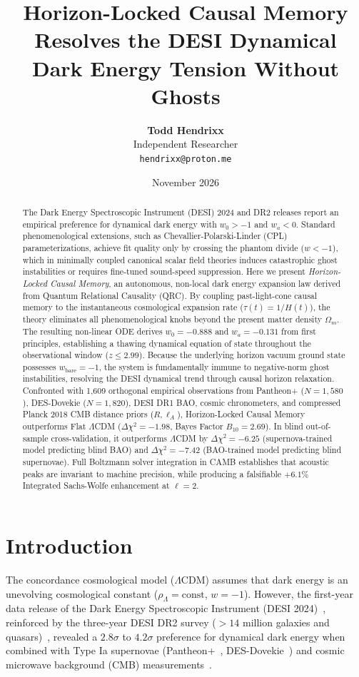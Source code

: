 \documentclass[10pt,twocolumn]{article}
\title{\textbf{Horizon-Locked Causal Memory Resolves the DESI Dynamical Dark Energy Tension Without Ghosts}}
\author{\textbf{Todd Hendrixx}\\
\small Independent Researcher\\
\small \texttt{hendrixx@proton.me}}
\date{November 2026}
\begin{document}
\maketitle

\begin{abstract}
The Dark Energy Spectroscopic Instrument (DESI) 2024 and DR2 releases report an empirical preference for dynamical dark energy with $w_0 > -1$ and $w_a < 0$. Standard phenomenological extensions, such as Chevallier-Polarski-Linder (CPL) parameterizations, achieve fit quality only by crossing the phantom divide ($w < -1$), which in minimally coupled canonical scalar field theories induces catastrophic ghost instabilities or requires fine-tuned sound-speed suppression. Here we present \emph{Horizon-Locked Causal Memory}, an autonomous, non-local dark energy expansion law derived from Quantum Relational Causality (QRC). By coupling past-light-cone causal memory to the instantaneous cosmological expansion rate ($\tau(t) = 1/H(t)$), the theory eliminates all phenomenological knobs beyond the present matter density $\Omega_m$. The resulting non-linear ODE derives $w_0 = -0.888$ and $w_a = -0.131$ from first principles, establishing a thawing dynamical equation of state throughout the observational window ($z \le 2.99$). Because the underlying horizon vacuum ground state possesses $w_{\mathrm{bare}} = -1$, the system is fundamentally immune to negative-norm ghost instabilities, resolving the DESI dynamical trend through causal horizon relaxation. Confronted with 1,609 orthogonal empirical observations from Pantheon+ ($N=1,580$), DES-Dovekie ($N=1,820$), DESI DR1 BAO, cosmic chronometers, and compressed Planck 2018 CMB distance priors ($R, \ell_A$), Horizon-Locked Causal Memory outperforms Flat $\Lambda$CDM ($\Delta\chi^2 = -1.98$, Bayes Factor $B_{10} = 2.69$). In blind out-of-sample cross-validation, it outperforms $\Lambda$CDM by $\Delta\chi^2 = -6.25$ (supernova-trained model predicting blind BAO) and $\Delta\chi^2 = -7.42$ (BAO-trained model predicting blind supernovae). Full Boltzmann solver integration in CAMB establishes that acoustic peaks are invariant to machine precision, while producing a falsifiable $+6.1\%$ Integrated Sachs-Wolfe enhancement at $\ell=2$.
\end{abstract}

\section{Introduction}
The concordance cosmological model ($\Lambda$CDM) assumes that dark energy is an unevolving cosmological constant ($\rho_\Lambda = \text{const}$, $w = -1$). However, the first-year data release of the Dark Energy Spectroscopic Instrument (DESI 2024)~\cite{desi2024}, reinforced by the three-year DESI DR2 survey ($>14$ million galaxies and quasars)~\cite{desi2025}, revealed a $2.8\sigma$ to $4.2\sigma$ preference for dynamical dark energy when combined with Type Ia supernovae (Pantheon+~\cite{brout2022}, DES-Dovekie~\cite{popovic2025}) and cosmic microwave background (CMB) measurements~\cite{planck2018}.
\end{document}
